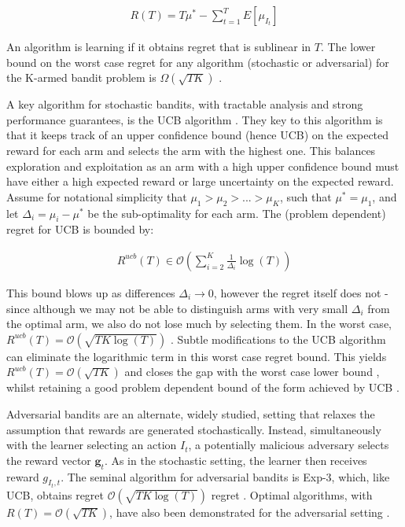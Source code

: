 \documentclass[11pt,a4paper]{article}
\newcommand{\eqn}[1]{\begin{align}#1\end{align}}
\newcommand{\bigo}[1]{\mathcal{O}\left( #1 \right)}
\newcommand{\bigomega}[1]{\Omega\left( #1 \right)}
\begin{document}
\eqn {
R(T) = T\mu^* - \sum_{t=1}^T E[\mu_{I_t}] 
} 

An algorithm is learning if it obtains regret that is sublinear in $T$. The lower bound on the worst case regret for any algorithm (stochastic or adversarial) for the K-armed bandit problem is  $\bigomega{\sqrt{TK}}$ \cite{Auer1995}.

A key algorithm for stochastic bandits, with tractable analysis and strong performance guarantees, is the UCB algorithm \cite{Auer2002}. They key to this algorithm is that it keeps track of an upper confidence bound (hence UCB) on the expected reward for each arm and selects the arm with the highest one. This balances exploration and exploitation as an arm with a high upper confidence bound must have either a high expected reward or large uncertainty on the expected reward. Assume for notational simplicity that $\mu_1 > \mu_2 > ... > \mu_K$, such that $\mu^* = \mu_1$, and let $\Delta_i = \mu_i - \mu^*$ be the sub-optimality for each arm. The (problem dependent) regret for UCB is bounded by: 

\eqn {
R^{ucb}(T) \in \bigo{\sum_{i=2}^K \frac{1}{\Delta_i}\log(T)}
}

This bound blows up as differences $\Delta_i \rightarrow 0$, however the regret itself does not - since although we may not be able to distinguish arms with very small $\Delta_i$ from the optimal arm, we also do not lose much by selecting them. In the worst case, $R^{ucb}(T) = \bigo{\sqrt{TK\log(T)}}$ \cite{Bubeck2012}. Subtle modifications to the UCB algorithm can eliminate the logarithmic term in this worst case regret bound. This yields $R^{ucb}(T) = \bigo{\sqrt{TK}}$ and closes the gap with the worst case lower bound \cite{Audibert2009,Lattimore2015}, whilst retaining a good problem dependent bound of the form achieved by UCB \cite{Lattimore2015}.

Adversarial bandits are an alternate, widely studied, setting that relaxes the assumption that rewards are generated stochastically. Instead, simultaneously with the learner selecting an action $I_t$, a potentially malicious adversary selects the reward vector $\boldsymbol{g}_t$. As in the stochastic setting, the learner then receives reward $g_{I_t,t}$. The seminal algorithm for adversarial bandits is Exp-3, which, like UCB, obtains regret $\bigo{\sqrt{TK\log(T)}}$ regret \cite{Auer1995}. Optimal algorithms, with $R(T) = \bigo{\sqrt{TK}}$, have also been demonstrated for the adversarial setting \cite{Audibert2009}.
\end{document}
